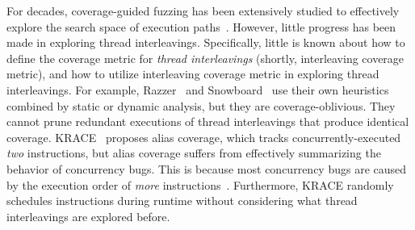 

For decades, coverage-guided fuzzing has been extensively studied to
effectively explore the search space of execution paths~\cite{janus,
  hydra, healer, imf, hfl, syzkaller, klee, s2e, kafl}.
%
However, little progress has been made in exploring thread
interleavings.
%
Specifically, little is known about how to define the coverage metric
for \textit{thread interleavings} (shortly, interleaving coverage
metric), and how to utilize interleaving coverage metric in exploring
thread interleavings.
%
For example, Razzer~\cite{razzer} and Snowboard~\cite{snowboard} use
their own heuristics combined by static or dynamic analysis, but they
are coverage-oblivious.  They cannot prune redundant executions of
thread interleavings that produce identical coverage.
%
KRACE~\cite{krace} proposes alias coverage, which tracks
concurrently-executed \textit{two} instructions, but alias coverage
suffers from effectively summarizing the behavior of concurrency bugs.
This is because most concurrency bugs are caused by the execution
order of \textit{more} instructions~\cite{learningfrommistakes}.
Furthermore, KRACE randomly schedules instructions during runtime
without considering what thread interleavings are explored before.

